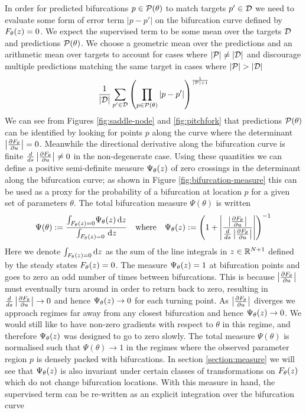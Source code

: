 In order for predicted bifurcations $p\in\mathcal{P}(\theta)$ to match targets $p'\in\mathcal{D}$ we need to evaluate some form of error term $|p-p'|$ on the bifurcation curve defined by $F_{\theta}(z)=0$. We expect the supervised term to be some mean over the targets $\mathcal{D}$ and predictions $\mathcal{P}(\theta)$. We choose a geometric mean over the predictions and an arithmetic mean over targets to account for cases where $|\mathcal{P}|\neq|\mathcal{D}|$ and discourage multiple predictions matching the same target in cases where $|\predictions|>|\targets|$
\begin{align}
    \frac{1}{|\mathcal{D}|}\sum_{p'\in\mathcal{D}}
    \left(\prod_{p\in\mathcal{P}(\theta)}|p-p'|\right)
    ^{\frac{1}{|\mathcal{P}|+1}}
\end{align}
We can see from Figures \ref{fig:saddle-node} and \ref{fig:pitchfork} that predictions $\mathcal{P}(\theta)$ can be identified by looking for points $p$ along the curve where the determinant $\left| \frac{\partial F_{\theta}}{\partial u} \right|=0$. Meanwhile the directional derivative along the bifurcation curve is finite $\frac{d}{ds}\left| \frac{\partial F_{\theta}}{\partial u} \right|\neq 0$ in the non-degenerate case. Using these quantities we can define a positive semi-definite measure $\Psi_{\theta}(z)$ of zero crossings in the determinant along the bifurcation curve; as shown in Figure \ref{fig:bifurcation-measure} this can be used as a proxy for the probability of a bifurcation at location $p$ for a given set of parameters $\theta$. The total bifurcation measure $\Psi(\theta)$ is written
\begin{align}
    \Psi(\theta):=\frac{
        \int_{F_{\theta}(z)=0}\!
        \Psi_{\theta}(z)\,\mathrm{d}z
    }{
        \int_{F_{\theta}(z)=0}\!\
        \mathrm{d}z
    }
    \quad\mathrm{where}\quad
    \Psi_{\theta}(z):=
    \left(1+\left|\frac{\left| \frac{\partial F_{\theta}}{\partial u} \right|}{\frac{d}{ds}\left| \frac{\partial F_{\theta}}{\partial u} \right|}\right|\right)^{-1}
    \label{eq:measure}
\end{align}
Here we denote $\int_{F_{\theta}(z)=0}\mathrm{d}z$ as the sum of the line integrals in $z\in\mathbb{R}^{N+1}$ defined by the steady states $F_{\theta}(z)=0$. The measure $\Psi_{\theta}(z)=1$ at bifurcation points and goes to zero an odd number of times between bifurcations. This is because $\left| \frac{\partial F_{\theta}}{\partial u} \right|$ must eventually turn around in order to return back to zero, resulting in $\frac{d}{ds}\left| \frac{\partial F_{\theta}}{\partial u} \right|\rightarrow0$ and hence $\Psi_{\theta}(z)\rightarrow0$ for each turning point. As $\left| \frac{\partial F_{\theta}}{\partial u} \right|$ diverges we approach regimes far away from any closest bifurcation and hence $\Psi_{\theta}(z)\rightarrow0$. We would still like to have non-zero gradients with respect to $\theta$ in this regime, and therefore $\Psi_{\theta}(z)$ was designed to go to zero slowly. The total measure $\Psi(\theta)$ is normalised such that $\Psi(\theta)\rightarrow1$ in the regimes where the observed parameter region $p$ is densely packed with bifurcations. In section \ref{section:measure} we will see that $\Psi_{\theta}(z)$ is also invariant under certain classes of transformations on $F_{\theta}(z)$ which do not change bifurcation locations. With this measure in hand, the supervised term can be re-written as an explicit integration over the bifurcation curve
